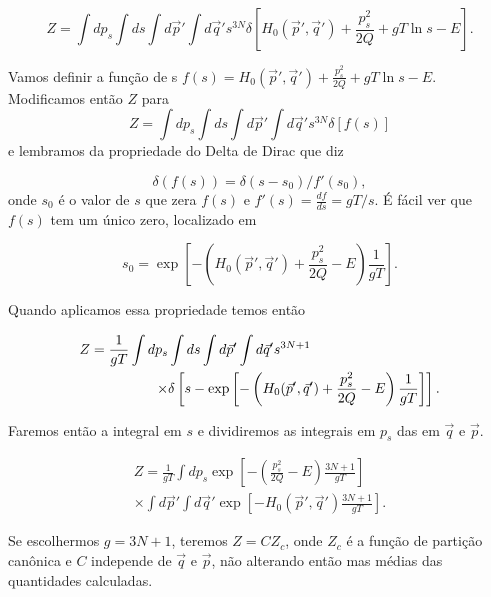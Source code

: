 \documentclass[twoside, a4paper]{article}
\newcommand{\deri}[2]{\frac{d #1}{d #2}}
\begin{document}
\begin{equation}
	Z = \int dp_s \int ds \int d\vec{p}' \int d\vec{q}' s^{3N}\delta\left[H_0(\vec{p}', \vec{q}') + \frac{p_s^2}{2Q} + gT \ln s -E \right].
\end{equation}

Vamos definir a função de s $f(s) = H_0(\vec{p}', \vec{q}') + \frac{p_s^2}{2Q} + gT \ln s -E$. Modificamos então $Z$ para
\begin{equation}
	Z = \int dp_s \int ds \int d\vec{p}' \int d\vec{q}' s^{3N}\delta\left[f(s)\right]
\end{equation}
e lembramos da propriedade do Delta de Dirac que diz

\begin{equation}
	\delta(f(s)) = \delta(s-s_0)/f'(s_0),
\end{equation}
onde $s_0$ é o valor de $s$ que zera $f(s)$ e $f'(s) = \deri{f}{s} = gT/s$. É fácil ver que $f(s)$ tem um único zero, localizado em

\begin{equation}
	s_0 = \exp\left[-\left( H_0(\vec{p}', \vec{q}') + \frac{p_s^2}{2Q} -E\right)\frac{1}{gT}\right].
\end{equation}

Quando aplicamos essa propriedade temos então

\begin{align}
	Z = \frac{1}{gT} \int dp_s & \int ds \int d\vec{p}' \int d\vec{q}' s^{3N+1}  \notag \\ 
	   \times&\delta\left[s - \exp\left[-\left( H_0(\vec{p}', \vec{q}') + \frac{p_s^2}{2Q} -E\right)\frac{1}{gT}\right]\right].
\end{align}

Faremos então a integral em $s$ e dividiremos as integrais em $p_s$ das em $\vec{q}$ e $\vec{p}$.

\begin{align}
	Z = \frac{1}{gT} \int dp_s \exp\left[-\left( \frac{p_s^2}{2Q} - E\right)\frac{3N+1}{gT}\right] \\
	\times \int d\vec{p}' \int d\vec{q}' \exp\left[-H_0(\vec{p}', \vec{q}') \frac{3N+1}{gT}\right].
\end{align}

Se escolhermos $g=3N+1$, teremos $Z=C Z_c$, onde $Z_c$ é a função de partição canônica e $C$ independe de $\vec{q}$ e $\vec{p}$, não alterando então mas médias das quantidades calculadas.
\end{document}
